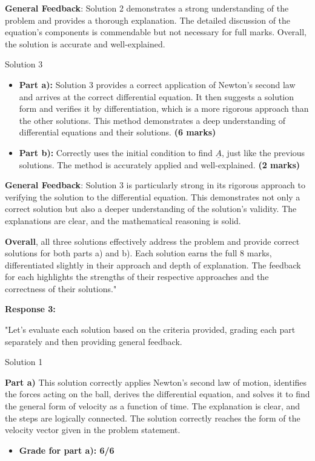 \documentclass[a4paper,11pt]{article}
\begin{document}
\textbf{General Feedback}: Solution 2 demonstrates a strong understanding of the problem and provides a thorough explanation. The detailed discussion of the equation's components is commendable but not necessary for full marks. Overall, the solution is accurate and well-explained.

Solution 3

\begin{itemize}
    \item \textbf{Part a):} Solution 3 provides a correct application of Newton's second law and arrives at the correct differential equation. It then suggests a solution form and verifies it by differentiation, which is a more rigorous approach than the other solutions. This method demonstrates a deep understanding of differential equations and their solutions. \textbf{(6 marks)}
    \item \textbf{Part b):} Correctly uses the initial condition to find \( \underline{A} \), just like the previous solutions. The method is accurately applied and well-explained. \textbf{(2 marks)}
\end{itemize}

\textbf{General Feedback}: Solution 3 is particularly strong in its rigorous approach to verifying the solution to the differential equation. This demonstrates not only a correct solution but also a deeper understanding of the solution's validity. The explanations are clear, and the mathematical reasoning is solid.

\textbf{Overall}, all three solutions effectively address the problem and provide correct solutions for both parts a) and b). Each solution earns the full 8 marks, differentiated slightly in their approach and depth of explanation. The feedback for each highlights the strengths of their respective approaches and the correctness of their solutions."

\textbf{Response 3:}

"Let's evaluate each solution based on the criteria provided, grading each part separately and then providing general feedback.

Solution 1

\textbf{Part a)} This solution correctly applies Newton's second law of motion, identifies the forces acting on the ball, derives the differential equation, and solves it to find the general form of velocity as a function of time. The explanation is clear, and the steps are logically connected. The solution correctly reaches the form of the velocity vector given in the problem statement.
\begin{itemize}
    \item \textbf{Grade for part a): 6/6}
\end{itemize}
\end{document}
